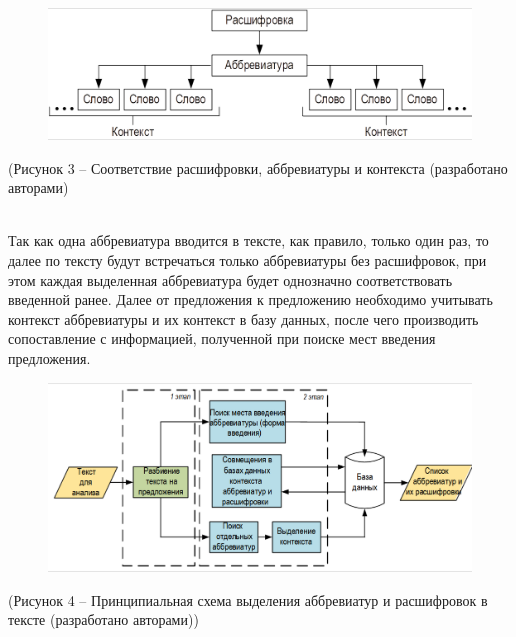 \documentclass[12pt]{article}
\begin{document}
\begin{figure}[h!]
    \centering
    \includegraphics[width=1\linewidth]{image3.png}
    \label{fig:enter-label}
\end{figure}
\vspace{3cm}
\begin{center}
    {(Рисунок 3 – Соответствие расшифровки, аббревиатуры и контекста (разработано авторами)} 
\end{center} \\
\indent Так как одна аббревиатура вводится в тексте, как правило, только один раз, то далее по тексту будут встречаться только аббревиатуры без расшифровок, при этом каждая выделенная аббревиатура будет однозначно соответствовать введенной ранее. Далее от предложения к предложению необходимо учитывать контекст аббревиатуры и их контекст в базу данных, после чего производить сопоставление с информацией, полученной при поиске мест введения предложения.

\begin{figure}[h!]
    \centering
    \includegraphics[width=1\linewidth]{image4.png}
    \label{fig:enter-label}
\end{figure}
\begin{center}
    {(Рисунок 4 – Принципиальная схема выделения аббревиатур и расшифровок в тексте (разработано авторами))} 
\end{center} \\
\indent \\
\indent \\
\indent \\
\end{document}
